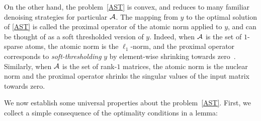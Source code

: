 On the other hand, the problem~\eqref{AST} is convex, and reduces to many
familiar denoising strategies for particular $\mathcal{A}$. The mapping from $y$ to the
optimal solution of \eqref{AST} is called the proximal operator of the atomic
norm applied to $y$, and can be thought of as a soft thresholded version of $y$.
Indeed, when $\mathcal{A}$ is the set of $1$-sparse atoms, the atomic norm is the
$\ell_1$-norm, and the proximal operator corresponds to \emph{soft-thresholding}
$y$ by element-wise shrinking towards zero~\cite{donoho1995noising}. Similarly,
when $\mathcal{A}$ is the set of rank-$1$ matrices, the atomic norm is the nuclear norm
and the proximal operator shrinks the singular values of the input matrix
towards zero.

We now establish some universal properties about the problem~\eqref{AST}.
First, we collect a simple consequence of the optimality conditions in a lemma:

